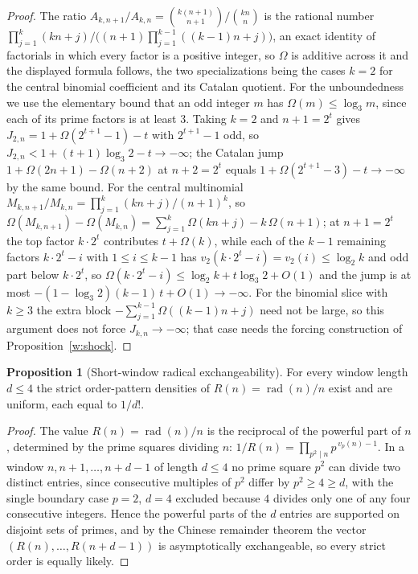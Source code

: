 \documentclass[11pt]{article}
\theoremstyle{definition}
\newtheorem{proposition}{Proposition}
\begin{document}
\begin{proof}
The ratio $A_{k,n+1}/A_{k,n}=\binom{k(n+1)}{n+1}/\binom{kn}{n}$ is the rational number $\prod_{j=1}^{k}(kn+j)\big/\bigl((n+1)\prod_{j=1}^{k-1}((k-1)n+j)\bigr)$, an exact identity of factorials in which every factor is a positive integer, so $\Omega$ is additive across it and the displayed formula follows, the two specializations being the cases $k=2$ for the central binomial coefficient and its Catalan quotient.  For the unboundedness we use the elementary bound that an odd integer $m$ has $\Omega(m)\le\log_3 m$, since each of its prime factors is at least $3$.  Taking $k=2$ and $n+1=2^t$ gives $J_{2,n}=1+\Omega(2^{t+1}-1)-t$ with $2^{t+1}-1$ odd, so $J_{2,n}<1+(t+1)\log_3 2-t\to-\infty$; the Catalan jump $1+\Omega(2n+1)-\Omega(n+2)$ at $n+2=2^t$ equals $1+\Omega(2^{t+1}-3)-t\to-\infty$ by the same bound.  For the central multinomial $M_{k,n+1}/M_{k,n}=\prod_{j=1}^{k}(kn+j)\big/(n+1)^k$, so $\Omega(M_{k,n+1})-\Omega(M_{k,n})=\sum_{j=1}^{k}\Omega(kn+j)-k\,\Omega(n+1)$; at $n+1=2^t$ the top factor $k\cdot2^t$ contributes $t+\Omega(k)$, while each of the $k-1$ remaining factors $k\cdot2^t-i$ with $1\le i\le k-1$ has $v_2(k\cdot2^t-i)=v_2(i)\le\log_2 k$ and odd part below $k\cdot2^t$, so $\Omega(k\cdot2^t-i)\le\log_2 k+t\log_3 2+O(1)$ and the jump is at most $-(1-\log_3 2)(k-1)\,t+O(1)\to-\infty$.  For the binomial slice with $k\ge3$ the extra block $-\sum_{j=1}^{k-1}\Omega((k-1)n+j)$ need not be large, so this argument does not force $J_{k,n}\to-\infty$; that case needs the forcing construction of Proposition~\ref{w:shock}.
\end{proof}

\begin{proposition}[Short-window radical exchangeability]\label{w:radunif}
For every window length $d\le4$ the strict order-pattern densities of $R(n)=\operatorname{rad}(n)/n$ exist and are uniform, each equal to $1/d!$.
\end{proposition}

\begin{proof}
The value $R(n)=\operatorname{rad}(n)/n$ is the reciprocal of the powerful part of $n$, determined by the prime squares dividing $n$: $1/R(n)=\prod_{p^2\mid n}p^{\,v_p(n)-1}$.  In a window $n,n+1,\ldots,n+d-1$ of length $d\le4$ no prime square $p^2$ can divide two distinct entries, since consecutive multiples of $p^2$ differ by $p^2\ge4\ge d$, with the single boundary case $p=2$, $d=4$ excluded because $4$ divides only one of any four consecutive integers.  Hence the powerful parts of the $d$ entries are supported on disjoint sets of primes, and by the Chinese remainder theorem the vector $(R(n),\ldots,R(n+d-1))$ is asymptotically exchangeable, so every strict order is equally likely.
\end{proof}
\end{document}

